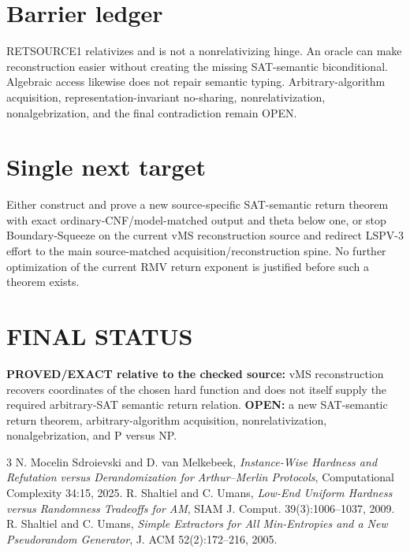 \documentclass[11pt]{article}
\begin{document}
\section*{Barrier ledger}
RETSOURCE1 relativizes and is not a nonrelativizing hinge. An oracle can make reconstruction easier without creating the missing SAT-semantic biconditional. Algebraic access likewise does not repair semantic typing. Arbitrary-algorithm acquisition, representation-invariant no-sharing, nonrelativization, nonalgebrization, and the final contradiction remain OPEN.

\section*{Single next target}
Either construct and prove a new source-specific SAT-semantic return theorem with exact ordinary-CNF/model-matched output and theta below one, or stop Boundary-Squeeze on the current vMS reconstruction source and redirect LSPV-3 effort to the main source-matched acquisition/reconstruction spine. No further optimization of the current RMV return exponent is justified before such a theorem exists.

\section*{FINAL STATUS}
\textbf{PROVED/EXACT relative to the checked source:} vMS reconstruction recovers coordinates of the chosen hard function and does not itself supply the required arbitrary-SAT semantic return relation. \textbf{OPEN:} a new SAT-semantic return theorem, arbitrary-algorithm acquisition, nonrelativization, nonalgebrization, and P versus NP.

\begin{thebibliography}{3}
 N. Mocelin Sdroievski and D. van Melkebeek, \emph{Instance-Wise Hardness and Refutation versus Derandomization for Arthur--Merlin Protocols}, Computational Complexity 34:15, 2025.
 R. Shaltiel and C. Umans, \emph{Low-End Uniform Hardness versus Randomness Tradeoffs for AM}, SIAM J. Comput. 39(3):1006--1037, 2009.
 R. Shaltiel and C. Umans, \emph{Simple Extractors for All Min-Entropies and a New Pseudorandom Generator}, J. ACM 52(2):172--216, 2005.
\end{thebibliography}
\end{document}
